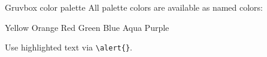 \documentclass[aspectratio=169, 12pt]{beamer}
\begin{document}
\begin{frame}{Gruvbox color palette}
	All palette colors are available as named colors:

	\medskip
	\textcolor{gbYellow}{Yellow} \quad
	\textcolor{gbOrange}{Orange} \quad
	\textcolor{gbRed}{Red} \quad
	\textcolor{gbGreen}{Green} \quad
	\textcolor{gbBlue}{Blue} \quad
	\textcolor{gbAqua}{Aqua} \quad
	\textcolor{gbPurple}{Purple}

	\medskip
	Use \alert{highlighted text} via \texttt{\textbackslash alert\{\}}.
\end{frame}
\end{document}
